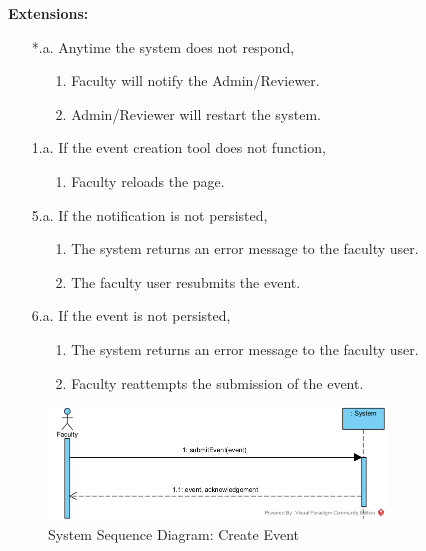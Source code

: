 \textbf{Extensions:}
\begin{enumerate}
    \item[*.a.] Anytime the system does not respond,
    \begin{enumerate}
        \item[1.] Faculty will notify the Admin/Reviewer.
        \item[2.] Admin/Reviewer will restart the system.
    \end{enumerate}
    \item [1.a.]  If the event creation tool does not function,
    \begin{enumerate}
        \item[1.] Faculty reloads the page.
    \end{enumerate}
    \item [5.a.] If the notification is not persisted,
    \begin{enumerate}
        \item [1.] The system returns an error message to the faculty user.
        \item[2.] The faculty user resubmits the event.
    \end{enumerate}
    \item [6.a.] If the event is not persisted,
    \begin{enumerate}
        \item [1.] The system returns an error message to the faculty user.
        \item [2.] Faculty reattempts the submission of the event.
    \end{enumerate}
\end{enumerate}

\begin{figure}[H]
    \centering
    \includegraphics[width=0.8\textwidth]{images/SSD-UC04-CreateEvent.png}
    \centering
    \caption{System Sequence Diagram: Create Event}
\end{figure}